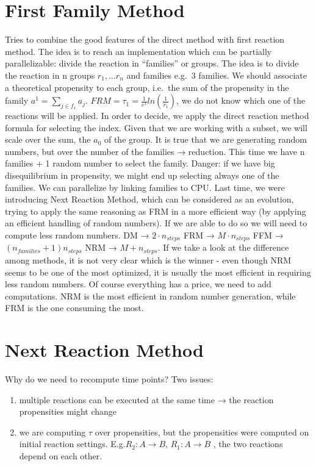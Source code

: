 \section{First Family Method}
Tries to combine the good features of the direct method with first reaction method.
The idea is to reach an implementation which can be partially parallelizable: divide the reaction in ``families'' or groups.
The idea is to divide the reaction in n groups $r_1,…r_n$ and families e.g.~3 families.
We should associate a theoretical propensity to each group, i.e.~the sum of the propensity in the family $a^1=\sum_{j\in f_1}a_j$.
$FRM= \tau_1= \frac{1}{e^1}ln(\frac{1}{r_1})$, we do not know which one of the reactions will be applied.
In order to decide, we apply the direct reaction method formula for selecting the index.
Given that we are working with a subset, we will scale over the sum, the $a_0$ of the group.
It is true that we are generating random numbers, but over the number of the families → reduction.
This time we have n families + 1 random number to select the family.
Danger: if we have big disequilibrium in propensity, we might end up selecting always one of the families.
We can parallelize by linking families to CPU.
Last time, we were introducing Next Reaction Method, which can be considered as an evolution, trying to apply the same reasoning as FRM in a more efficient way (by applying an efficient handling of random numbers).
If we are able to do so we will need to compute less random numbers.
DM → $2 \cdot n_{steps}$ FRM → $M \cdot n_{steps}$ FFM → $(n_{families}+ 1)n_{steps}$ NRM → $M+n_{steps}$.
If we take a look at the difference among methods, it is not very clear which is the winner - even though NRM seems to be one of the most optimized, it is usually the most efficient in requiring less random numbers.
Of course everything has a price, we need to add computations.
NRM is the most efficient in random number generation, while FRM is the one consuming the most.

\section{Next Reaction Method}
Why do we need to recompute time points? Two issues:

\begin{enumerate}
  \def\labelenumi{\arabic{enumi}.}
  \item multiple reactions can be executed at the same time → the reaction propensities might change \item we are computing $\tau$ over propensities, but the propensities were computed on initial reaction settings.
  E.g.$R_2:A \rightarrow B$, $R_1 : A \rightarrow B$ , the two reactions depend on each other.
\end{enumerate}

